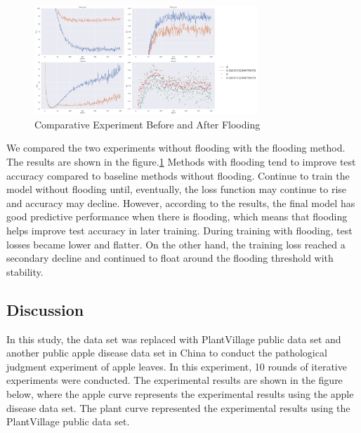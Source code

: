 \documentclass[a4paper,fleqn]{cas-sc}
\begin{document}
\begin{figure}
\centering
\includegraphics[width=0.75\textwidth]{figs_rev1/f8.png}
\caption{Comparative Experiment Before and After Flooding}
\label{fig:f78}
\end{figure}

We compared the two experiments without flooding with the flooding method. The results are shown in the figure.\ref{fig:f78} Methods with flooding tend to improve test accuracy compared to baseline methods without flooding. Continue to train the model without flooding until, eventually, the loss function may continue to rise and accuracy may decline. However, according to the results, the final model has good predictive performance when there is flooding, which means that flooding helps improve test accuracy in later training. During training with flooding, test losses became lower and flatter. On the other hand, the training loss reached a secondary decline and continued to float around the flooding threshold with stability.

\subsection{Discussion}
In this study, the data set was replaced with PlantVillage public data set and another public apple disease data set in China to conduct the pathological judgment experiment of apple leaves. In this experiment, 10 rounds of iterative experiments were conducted. The experimental results are shown in the figure below, where the apple curve represents the experimental results using the apple disease data set. The plant curve represented the experimental results using the PlantVillage public data set. 
\end{document}
